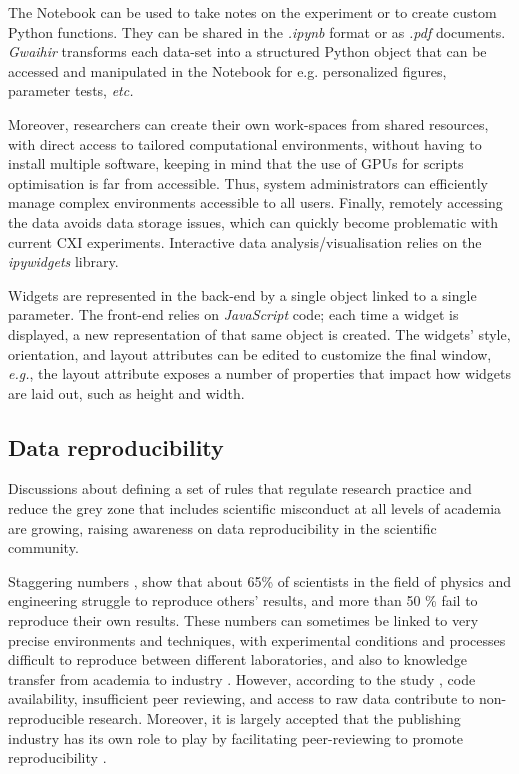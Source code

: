 The Notebook can be used to take notes on the experiment or to create custom Python functions. They can be shared in the \textit{.ipynb} format or as \textit{.pdf} documents. \textit{Gwaihir} transforms each data-set into a structured Python object that can be accessed and manipulated in the Notebook for e.g. personalized figures, parameter tests, \textit{etc.}

Moreover, researchers can create their own work-spaces from shared resources, with direct access to tailored computational environments, without having to install multiple software, keeping in mind that the use of GPUs for scripts optimisation is far from accessible.
Thus, system administrators can efficiently manage complex environments accessible to all users.
Finally, remotely accessing the data avoids data storage issues, which can quickly become problematic with current CXI experiments.
Interactive data analysis/visualisation relies on the \textit{ipywidgets} library.

Widgets are represented in the back-end by a single object linked to a single parameter.
The front-end relies on \textit{JavaScript} code; each time a widget is displayed, a new representation of that same object is created.
The widgets' style, orientation, and layout attributes can be edited to customize the final window, \textit{e.g.}, the layout attribute exposes a number of properties that impact how widgets are laid out, such as height and width.


\subsection{Data reproducibility}

Discussions about defining a set of rules that regulate research practice \parencite{Kretser2019} and reduce the grey zone that includes scientific misconduct at all levels of academia \parencite{Kornfeld2016} are growing, raising awareness on data reproducibility in the scientific community.

Staggering numbers \parencite{Baker2016}, show that about 65\% of scientists in the field of physics and engineering struggle to reproduce others' results, and more than 50 \% fail to reproduce their own results.
These numbers can sometimes be linked to very precise environments and techniques, with experimental conditions and processes difficult to reproduce between different laboratories, and also to knowledge transfer from academia to industry \parencite{DanielSarwitz2015}.
However, according to the study  \parencite{Baker2016}, code availability, insufficient peer reviewing, and access to raw data contribute to non-reproducible research.
Moreover, it is largely accepted that the publishing industry has its own role to play by facilitating peer-reviewing to promote reproducibility \parencite{Lee2017}.

